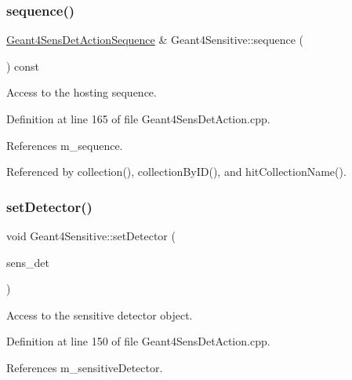 \subsubsection{\texorpdfstring{sequence()}{sequence()}}
{\footnotesize\ttfamily \hyperlink{class_d_d4hep_1_1_simulation_1_1_geant4_sens_det_action_sequence}{Geant4\+Sens\+Det\+Action\+Sequence} \& Geant4\+Sensitive\+::sequence (\begin{DoxyParamCaption}{ }\end{DoxyParamCaption}) const}



Access to the hosting sequence. 



Definition at line 165 of file Geant4\+Sens\+Det\+Action.\+cpp.



References m\+\_\+sequence.



Referenced by collection(), collection\+By\+I\+D(), and hit\+Collection\+Name().

\hypertarget{class_d_d4hep_1_1_simulation_1_1_geant4_sensitive_aac4f3a911f3818516bfb54a5b2bbef39}{}\label{class_d_d4hep_1_1_simulation_1_1_geant4_sensitive_aac4f3a911f3818516bfb54a5b2bbef39} 
\subsubsection{\texorpdfstring{set\+Detector()}{setDetector()}}
{\footnotesize\ttfamily void Geant4\+Sensitive\+::set\+Detector (\begin{DoxyParamCaption}\item[{\hyperlink{class_d_d4hep_1_1_simulation_1_1_geant4_action_s_d}{Geant4\+Action\+SD} $\ast$}]{sens\+\_\+det }\end{DoxyParamCaption})}



Access to the sensitive detector object. 



Definition at line 150 of file Geant4\+Sens\+Det\+Action.\+cpp.



References m\+\_\+sensitive\+Detector.



